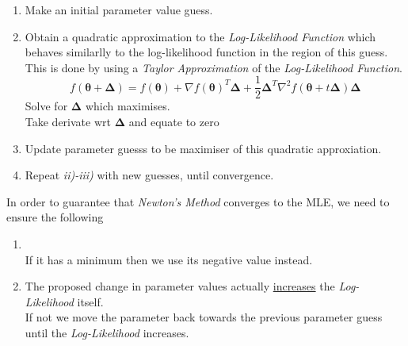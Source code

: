 \documentclass[11pt,a4paper]{article}
\begin{document}
\begin{enumerate}
	\item Make an initial parameter value guess.
	\item Obtain a quadratic approximation to the \textit{Log-Likelihood Function} which behaves similarlly to the log-likelihood function in the region of this guess.\\
	\nb This is done by using a \textit{Taylor Approximation} of the \textit{Log-Likelihood Function}.
	$$f(\pmb\theta+\pmb\Delta)=f(\pmb\theta)+\nabla f(\pmb\theta)^T\pmb\Delta+\frac12\pmb\Delta^T\nabla^2f(\pmb\theta+t\pmb\Delta)\pmb\Delta$$
	Solve for $\pmb\Delta$ which maximises.\\
	\nb Take derivate wrt $\pmb\Delta$ and equate to zero %
	\item Update parameter guesss to be maximiser of this quadratic approxiation.
	\item Repeat \textit{ii)-iii)} with new guesses, until convergence.
\end{enumerate}

In order to guarantee that \textit{Newton's Method} converges to the MLE, we need to ensure the following
\begin{enumerate}
	\item {}\\
	\nb If it has a minimum then we use its negative value instead.
	\item The proposed change in parameter values actually \underline{increases} the \textit{Log-Likelihood} itself.\\
	If not we move the parameter back towards the previous parameter guess until the \textit{Log-Likelihood} increases.
\end{enumerate}
\end{document}
